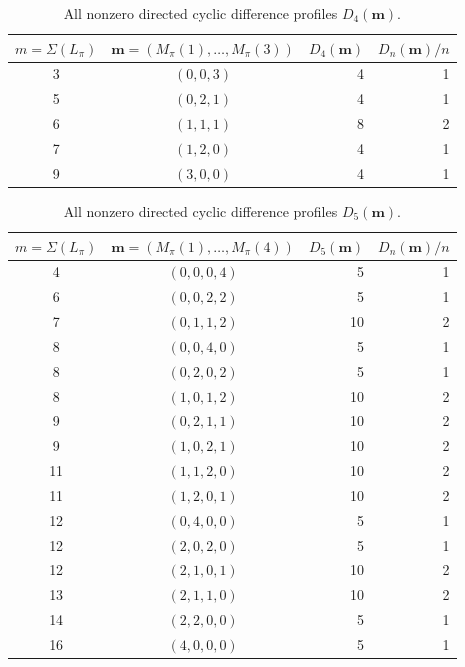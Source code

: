 \documentclass[11pt,a4paper]{amsart}
\newcommand{\1}{\mathbf{1}}
\begin{document}
\begin{table}[htbp]\centering\small
\caption{All nonzero directed cyclic difference profiles
\(D_{4}(\mathbf m)\).}
\label{tab:D4-profiles}
\renewcommand{\arraystretch}{1.05}
\begin{tabular}{c|c|r|r}
\(m=\Sigma(L_\pi)\) & \(\mathbf m=(M_\pi(1),\ldots,M_\pi(3))\)
& \(D_4(\mathbf m)\) & \(D_n(\mathbf m)/n\)\\ \hline
3 & $(0,0,3)$ & 4 & 1\\
5 & $(0,2,1)$ & 4 & 1\\
6 & $(1,1,1)$ & 8 & 2\\
7 & $(1,2,0)$ & 4 & 1\\
9 & $(3,0,0)$ & 4 & 1\\
\end{tabular}
\end{table}
\begin{table}[htbp]\centering\small
\caption{All nonzero directed cyclic difference profiles
\(D_{5}(\mathbf m)\).}
\label{tab:D5-profiles}
\renewcommand{\arraystretch}{1.05}
\begin{tabular}{c|c|r|r}
\(m=\Sigma(L_\pi)\) & \(\mathbf m=(M_\pi(1),\ldots,M_\pi(4))\)
& \(D_5(\mathbf m)\) & \(D_n(\mathbf m)/n\)\\ \hline
4 & $(0,0,0,4)$ & 5 & 1\\
6 & $(0,0,2,2)$ & 5 & 1\\
7 & $(0,1,1,2)$ & 10 & 2\\
8 & $(0,0,4,0)$ & 5 & 1\\
8 & $(0,2,0,2)$ & 5 & 1\\
8 & $(1,0,1,2)$ & 10 & 2\\
9 & $(0,2,1,1)$ & 10 & 2\\
9 & $(1,0,2,1)$ & 10 & 2\\
11 & $(1,1,2,0)$ & 10 & 2\\
11 & $(1,2,0,1)$ & 10 & 2\\
12 & $(0,4,0,0)$ & 5 & 1\\
12 & $(2,0,2,0)$ & 5 & 1\\
12 & $(2,1,0,1)$ & 10 & 2\\
13 & $(2,1,1,0)$ & 10 & 2\\
14 & $(2,2,0,0)$ & 5 & 1\\
16 & $(4,0,0,0)$ & 5 & 1\\
\end{tabular}
\end{table}
\end{document}
